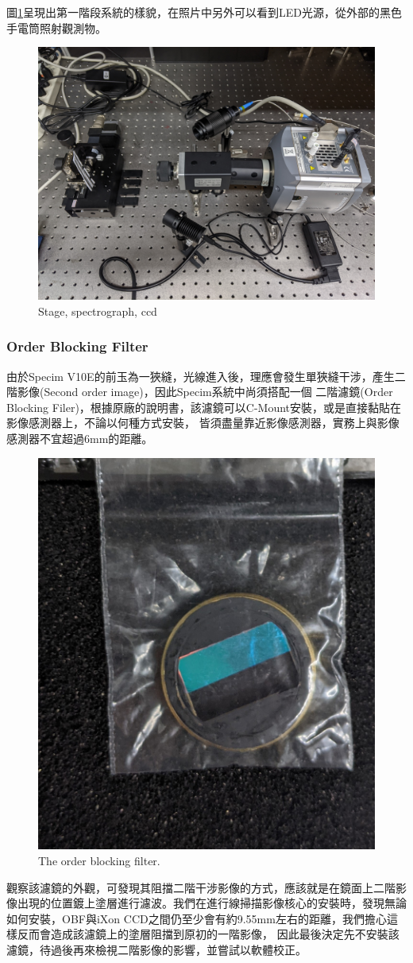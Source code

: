 \documentclass[12pt]{article}
\begin{document}
圖\ref{figure: 1 stage setup}呈現出第一階段系統的樣貌，在照片中另外可以看到LED光源，從外部的黑色手電筒照射觀測物。
\begin{figure}[h]
    \centering
    \includegraphics[width=0.65\linewidth]{PXL_20210723_094307842.jpg}
    \caption{Stage, spectrograph, ccd}
    \label{figure: 1 stage setup}
\end{figure}

\subsubsection{Order Blocking Filter} \label{sec: OBF}
由於Specim V10E的前玉為一狹縫，光線進入後，理應會發生單狹縫干涉，產生二階影像(Second order image)，因此Specim系統中尚須搭配一個
二階濾鏡(Order Blocking Filer)，根據原廠的說明書，該濾鏡可以C-Mount安裝，或是直接黏貼在影像感測器上，不論以何種方式安裝，
皆須盡量靠近影像感測器，實務上與影像感測器不宜超過6mm的距離\cite{manual}。
\begin{figure}[h]
    \centering
    \includegraphics[width=0.5\linewidth]{PXL_20210723_094341395.jpg}
    \caption{The order blocking filter.}
    \label{figure: obf}
\end{figure}
觀察該濾鏡的外觀，可發現其阻擋二階干涉影像的方式，應該就是在鏡面上二階影像出現的位置鍍上塗層進行濾波。我們在進行線掃描影像核心的安裝時，發現無論如何安裝，OBF與iXon CCD之間仍至少會有約9.55mm左右的距離，我們擔心這樣反而會造成該濾鏡上的塗層阻擋到原初的一階影像，
因此最後決定先不安裝該濾鏡，待過後再來檢視二階影像的影響，並嘗試以軟體校正。
\end{document}

